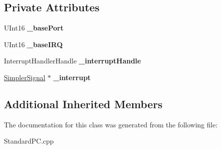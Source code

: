 \subsection*{Private Attributes}
\begin{DoxyCompactItemize}
\item 
\mbox{\label{class_standard_p_c___internal_1_1_legacy_a_t_a_a727b37f7180d933da8c03f5685713295}} 
U\+Int16 {\bfseries \+\_\+base\+Port}
\item 
\mbox{\label{class_standard_p_c___internal_1_1_legacy_a_t_a_a92105e75e917c74df11d339f66eeb58b}} 
U\+Int16 {\bfseries \+\_\+base\+I\+RQ}
\item 
\mbox{\label{class_standard_p_c___internal_1_1_legacy_a_t_a_a23ae255e2a3fd2f52be2ec4ad5984fab}} 
Interrupt\+Handler\+Handle {\bfseries \+\_\+interrupt\+Handle}
\item 
\mbox{\label{class_standard_p_c___internal_1_1_legacy_a_t_a_a146933e80ad4f57cb2a01558bea42cb4}} 
\hyperlink{class_standard_p_c___internal_1_1_legacy_a_t_a_1_1_simpler_signal}{Simpler\+Signal} $\ast$ {\bfseries \+\_\+interrupt}
\end{DoxyCompactItemize}
\subsection*{Additional Inherited Members}


The documentation for this class was generated from the following file\+:\begin{DoxyCompactItemize}
\item 
Standard\+P\+C.\+cpp\end{DoxyCompactItemize}
